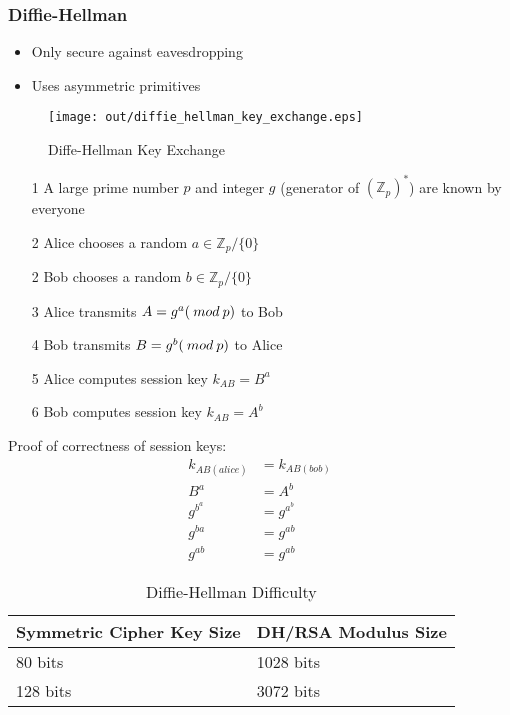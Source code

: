 \documentclass[a4paper]{article}
\begin{document}
\subsubsection{Diffie-Hellman}

\begin{itemize}
  \item Only secure against eavesdropping
  \item Uses asymmetric primitives
\end{itemize}

\begin{figure}[h!]
  \centering
  \texttt{[image: out/diffie\_hellman\_key\_exchange.eps]}
  \caption{Diffe-Hellman Key Exchange}
  \label{fig:diffe_hellman_key_exchange}
\end{figure}
\FloatBarrier


\begin{enumerate}
  \item[1] A large prime number $p$ and integer $g$ (generator of
           $(\mathbb{Z}_{p})^{*}$) are known by everyone
  \item[2] Alice chooses a random $a \in \mathbb{Z}_{p} / \{0\}$
  \item[2] Bob chooses a random $b \in \mathbb{Z}_{p} / \{0\}$
  \item[3] Alice transmits $A = g^{a} (\: mod \: p)$ to Bob
  \item[4] Bob transmits $B = g^{b} (\: mod \: p)$ to Alice
  \item[5] Alice computes session key $k_{AB} = B^{a}$
  \item[6] Bob computes session key $k_{AB} = A^{b}$
\end{enumerate}


Proof of correctness of session keys:
\begin{align*}
  k_{AB(alice)} &= k_{AB(bob)} \\
  B^{a} &= A^{b} \\
  g^{b^{a}} &= g^{a^{b}} \\
  g^{ba} &= g^{ab} \\
  g^{ab} &= g^{ab}
\end{align*}


\begin{table}[h]
  \centering
  \begin{tabular}{@{}ll@{}}
    \toprule
    Symmetric Cipher Key Size & DH/RSA Modulus Size \\
    \midrule
    80 bits                   & 1028 bits           \\
    128 bits                  & 3072 bits           \\
    \bottomrule
  \end{tabular}
  \caption{Diffie-Hellman Difficulty}
  \label{tab:diffie_hellman_difficulty}
\end{table}
\FloatBarrier
\end{document}

